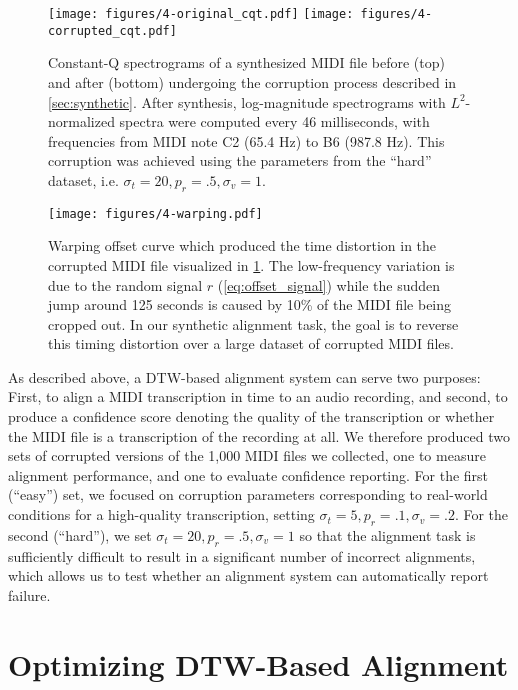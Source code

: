 \begin{figure}
  \centering
  \texttt{[image: figures/4-original\_cqt.pdf]}
  \texttt{[image: figures/4-corrupted\_cqt.pdf]}
  \caption[Constant-Q spectrograms of a MIDI file before and after corruption]{Constant-Q spectrograms of a synthesized MIDI file before (top) and after (bottom) undergoing the corruption process described in \cref{sec:synthetic}.
After synthesis, log-magnitude spectrograms with $L^2$-normalized spectra were computed every 46 milliseconds, with frequencies from MIDI note C2 (65.4 Hz) to B6 (987.8 Hz).
This corruption was achieved using the parameters from the ``hard'' dataset, i.e. $\sigma_t = 20, p_r = .5, \sigma_v = 1$.}
  \label{fig:corruption}
\end{figure}

\begin{figure}
  \centering
  \texttt{[image: figures/4-warping.pdf]}
  \caption[Example synthetic warping offset]{Warping offset curve which produced the time distortion in the corrupted MIDI file visualized in \cref{fig:corruption}.
The low-frequency variation is due to the random signal $r$ (\cref{eq:offset_signal}) while the sudden jump around 125 seconds is caused by 10\% of the MIDI file being cropped out.
In our synthetic alignment task, the goal is to reverse this timing distortion over a large dataset of corrupted MIDI files.}
  \label{fig:warping}
\end{figure}

As described above, a DTW-based alignment system can serve two purposes: First, to align a MIDI transcription in time to an audio recording, and second, to produce a confidence score denoting the quality of the transcription or whether the MIDI file is a transcription of the recording at all.
We therefore produced two sets of corrupted versions of the 1,000 MIDI files we collected, one to measure alignment performance, and one to evaluate confidence reporting.
For the first (``easy'') set, we focused on corruption parameters corresponding to real-world conditions for a high-quality transcription, setting $\sigma_t = 5, p_r = .1, \sigma_v = .2$.
For the second (``hard''), we set $\sigma_t = 20, p_r = .5, \sigma_v = 1$ so that the alignment task is sufficiently difficult to result in a significant number of incorrect alignments, which allows us to test whether an alignment system can automatically report failure.

\section{Optimizing DTW-Based Alignment}
\label{sec:optimizing}

